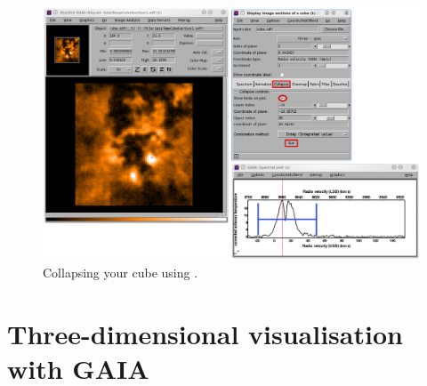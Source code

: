 \documentclass[11pt,oneside,chapters]{starlink}
\begin{document}
\begin{figure}[h!]
\begin{center}
\includegraphics[width=0.9\linewidth]{sc20_gaia_collapse}
\caption[Collapsing your cube using \gaia.]{\label{fig:gaia_collapse}
  Collapsing your cube using \gaia.}
\end{center}
\end{figure}

\section{Three-dimensional visualisation with GAIA}
\end{document}
